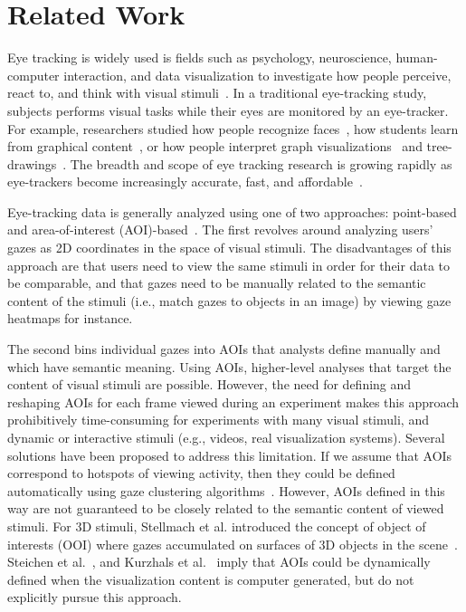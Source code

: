 \section{Related Work}
Eye tracking is widely used is fields such as psychology, neuroscience, human-computer interaction, and data visualization to investigate how people perceive, react to, and think with visual stimuli~\cite{duchowski2002breadth}. In a traditional eye-tracking study, subjects performs visual tasks while their eyes are monitored by an eye-tracker. For example, researchers studied how people recognize faces~\cite{guo2014perceiving}, how students learn from graphical content~\cite{mayer2010unique}, or how people interpret graph visualizations~\cite{pohl2009comparing, huang2008beyond} and tree-drawings~\cite{burch2013visual}. The breadth and scope of eye tracking research is growing rapidly as eye-trackers become increasingly accurate, fast, and affordable~\cite{blascheck2014state}.  

Eye-tracking data is generally analyzed using one of two approaches: point-based and area-of-interest (AOI)-based~\cite{blascheck2014state}. The first revolves around analyzing users' gazes as 2D coordinates in the space of visual stimuli. The disadvantages of this approach are that users need to view the same stimuli in order for their data to be comparable, and that gazes need to be manually related to the semantic content of the stimuli (i.e., match gazes to objects in an image) by viewing gaze heatmaps for instance.  

The second bins individual gazes into AOIs that analysts define manually and which have semantic meaning. Using AOIs, higher-level analyses that target the content of visual stimuli are possible. However, the need for defining and reshaping AOIs for each frame viewed during an experiment makes this approach prohibitively time-consuming for experiments with many visual stimuli, and dynamic or interactive stimuli (e.g., videos, real visualization systems).  Several solutions have been proposed to address this limitation. If we assume that AOIs correspond to hotspots of viewing activity, then they could be defined automatically using gaze clustering algorithms~\cite{privitera2000algorithms, santella2004robust, drusch2014analysing}.  However, AOIs defined in this way are not guaranteed to be closely related to the semantic content of viewed stimuli.  For 3D stimuli, Stellmach et al. introduced the concept of object of interests (OOI) where gazes accumulated on surfaces of 3D objects in the scene~\cite{stellmach20103d}. Steichen et al.~\cite{steichen2013user}, and Kurzhals et al.~\cite{kurzhals2014iseecube} imply that AOIs could be dynamically defined when the visualization content is computer generated, but do not explicitly pursue this approach. 

